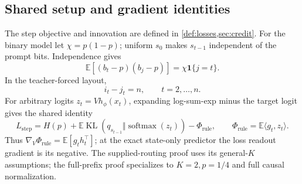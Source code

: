 \providecommand{\LRstep}{L_{\mathrm{step}}}
\providecommand{\LRout}{L_{\mathrm{out}}}
\providecommand{\LRsig}{\sigma}
\providecommand{\LRnorm}[1]{\left\lVert #1\right\rVert}
\providecommand{\LRinner}[2]{\left\langle #1,#2\right\rangle}
\theoremstyle{plain}
\newtheorem{lrlemma}[lemma]{Lemma}
\newtheorem{lrproposition}[proposition]{Proposition}
\newtheorem{lrtheorem}[theorem]{Theorem}
\newtheorem{lrremark}[remark]{Remark}

\subsection{Shared setup and gradient identities}
\label{app:weak-routing-initial}

The step objective and innovation are defined in \cref{def:losses,sec:credit}.
For the binary model let $\chi=p(1-p)$; uniform $s_0$ makes $s_{t-1}$ independent
of the prompt bits. Independence gives
\begin{equation}\label{eq:lr-innovation-cov}
 \mathbb E[(b_t-p)(b_j-p)]=\chi\mathbf1\{j=t\}.
\end{equation}
In the teacher-forced layout,
\begin{equation}\label{eq:lr-constant-lag}
 i_t-j_t=n,\qquad t=2,\ldots,n.
\end{equation}
For arbitrary logits $z_t=Vh_\phi(x_t)$, expanding log-sum-exp minus the target
logit gives the shared identity
\begin{equation}\label{eq:lr-kl-decomp}
 L_{\mathrm{step}}=H(p)+\mathbb E\operatorname{KL}
 (q_{s_{t-1}}\Vert\operatorname{softmax}(z_t))-\Phi_{\mathrm{rule}},\qquad
 \Phi_{\mathrm{rule}}=\mathbb E\langle g_t,z_t\rangle.
\end{equation}
Thus $\nabla_V\Phi_{\mathrm{rule}}=\mathbb E[g_th_t^\top]$; at the exact
state-only predictor the loss readout gradient is its negative.
The supplied-routing proof uses its general-$K$ assumptions; the full-prefix
proof specializes to $K=2,p=1/4$ and full causal normalization.
